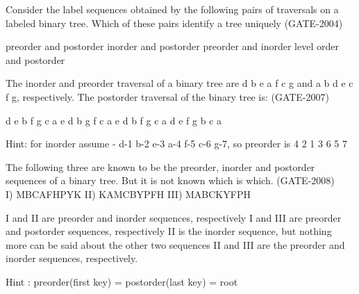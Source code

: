 \begin{questyle}
  \question  Consider the label sequences obtained by the following pairs of traversals on a
             labeled binary tree. Which of these pairs identify a tree uniquely  (GATE-2004)

  \begin{choices}
    \choice         preorder and postorder
    \CorrectChoice  inorder and postorder
    \CorrectChoice  preorder and inorder
    \choice         level order and postorder
  \end{choices}
\end{questyle}


\begin{questyle}
  \question  The inorder and preorder traversal of a binary tree are d b e a f c g and
             a b d e c f g, respectively. The postorder traversal of the binary tree is:  (GATE-2007)

  \begin{choices}
    \CorrectChoice  d e b f g c a
    \choice         e d b g f c a
    \choice         e d b f g c a
    \choice         d e f g b c a
  \end{choices}

  Hint: for inorder assume - d-1 b-2 e-3 a-4 f-5 c-6 g-7, so preorder is 4 2 1 3 6 5 7
\end{questyle}


\begin{questyle}
  \question  The following three are known to be the preorder, inorder and postorder sequences
             of a binary tree. But it is not known which is which.  (GATE-2008) \\
             I) MBCAFHPYK \qquad II) KAMCBYPFH \qquad III) MABCKYFPH

  \begin{choices}
    \choice         I and II are preorder and inorder sequences, respectively
    \choice         I and III are preorder and postorder sequences, respectively
    \choice         II is the inorder sequence, but nothing more can be said about the other two sequences
    \CorrectChoice  II and III are the preorder and inorder sequences, respectively.
  \end{choices}
   Hint : preorder(first key) =  postorder(last key) = root
\end{questyle}


